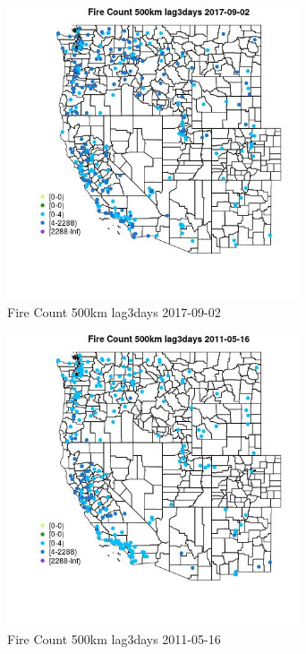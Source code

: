 \begin{figure} 
\centering  
\includegraphics[width=0.77\textwidth]{Code_Outputs/Report_ML_input_PM25_Step4_part_e_de_duplicated_aves_compiled_2019-05-21wNAs_MapObsFire_Count_500km_lag3days2017-09-02.jpg} 
\caption{\label{fig:Report_ML_input_PM25_Step4_part_e_de_duplicated_aves_compiled_2019-05-21wNAsMapObsFire_Count_500km_lag3days2017-09-02}Fire Count 500km lag3days 2017-09-02} 
\end{figure} 
 

\clearpage 

\begin{figure} 
\centering  
\includegraphics[width=0.77\textwidth]{Code_Outputs/Report_ML_input_PM25_Step4_part_e_de_duplicated_aves_compiled_2019-05-21wNAs_MapObsFire_Count_500km_lag3days2011-05-16.jpg} 
\caption{\label{fig:Report_ML_input_PM25_Step4_part_e_de_duplicated_aves_compiled_2019-05-21wNAsMapObsFire_Count_500km_lag3days2011-05-16}Fire Count 500km lag3days 2011-05-16} 
\end{figure} 
 

